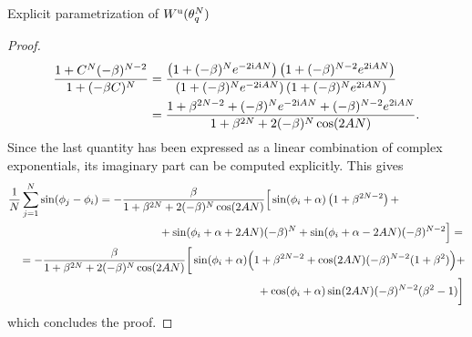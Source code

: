 \documentclass{article}
\theoremstyle{definition}
\renewcommand{\u}{\textnormal{u}}
\renewcommand{\i}{\textnormal{i}}
\begin{document}
\begin{section}{Explicit parametrization of $W^\u(\theta^N_q)$}
\begin{proof}
\begin{align*}
        \frac{1+C^N(-\beta)^{N-2}}{1+(-\beta C)^N}
        &=\frac{\left(1+(-\beta)^Ne^{-2\i AN}\right)\left(1+(-\beta)^{N-2}e^{2\i AN}\right)}{\left(1+(-\beta)^Ne^{-2\i AN}\right)\left(1+(-\beta)^Ne^{2\i AN}\right)}\\
        &=\frac{1+\beta^{2N-2}+(-\beta)^Ne^{-2\i AN}+(-\beta)^{N-2}e^{2\i AN}}{1+\beta^{2N}+2(-\beta)^N\cos(2AN)}.
    \end{align*}
    Since the last quantity has been expressed as a linear combination of complex exponentials, its imaginary part can be computed explicitly. This gives
    \begin{align*}
        \frac{1}{N}\sum_{j=1}^N\sin(\phi_j-\phi_i)&=-\frac{\beta}{1+\beta^{2N}+2(-\beta)^N\cos(2AN)}\Big[\sin(\phi_i+\alpha)\left(1+\beta^{2N-2}\right)+\\
        &\hspace{1.9cm}+\sin(\phi_i+\alpha+2AN)(-\beta)^N+\sin(\phi_i+\alpha-2AN)(-\beta)^{N-2}\Big]=\\
        &\hspace{-2.5cm}=-\frac{\beta}{1+\beta^{2N}+2(-\beta)^N\cos(2AN)}\bigg[\sin(\phi_i+\alpha)\Big(1+\beta^{2N-2}+\cos(2AN)(-\beta)^{N-2}(1+\beta^2)\Big)+\\
        &\hspace{5.0cm}+\cos(\phi_i+\alpha)\sin(2AN)(-\beta)^{N-2}(\beta^2-1)\bigg]
    \end{align*}
    which concludes the proof.
\end{proof}


\end{section}
\end{document}
